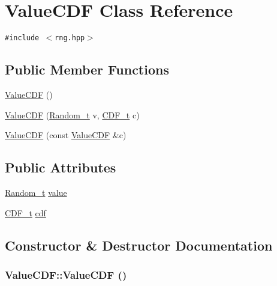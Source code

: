 \hypertarget{classValueCDF}{
\section{ValueCDF Class Reference}
\label{classValueCDF}
}
{\tt \#include $<$rng.hpp$>$}

\subsection*{Public Member Functions}
\begin{CompactItemize}
\item 
\hyperlink{classValueCDF_5fb4ab5f3819cb460bc77e784e8af38b}{ValueCDF} ()
\item 
\hyperlink{classValueCDF_234760674403fcf6b91be1aa5927584c}{ValueCDF} (\hyperlink{rng_8hpp_ad41e7f5d86b1109b6a6a032c86cdd3f}{Random\_\-t} v, \hyperlink{rng_8hpp_68ff29d325e1cb493f27ede4fa99c8e4}{CDF\_\-t} c)
\item 
\hyperlink{classValueCDF_e24002eb4692735666adfa50b1ccabba}{ValueCDF} (const \hyperlink{classValueCDF}{ValueCDF} \&c)
\end{CompactItemize}
\subsection*{Public Attributes}
\begin{CompactItemize}
\item 
\hyperlink{rng_8hpp_ad41e7f5d86b1109b6a6a032c86cdd3f}{Random\_\-t} \hyperlink{classValueCDF_3199cb7b55c7759bc3b4b231ba321e0e}{value}
\item 
\hyperlink{rng_8hpp_68ff29d325e1cb493f27ede4fa99c8e4}{CDF\_\-t} \hyperlink{classValueCDF_111ae2eb1b5618b9cf6c5a59da10fb18}{cdf}
\end{CompactItemize}


\subsection{Constructor \& Destructor Documentation}
\hypertarget{classValueCDF_5fb4ab5f3819cb460bc77e784e8af38b}{
\subsubsection[{ValueCDF}]{\setlength{\rightskip}{0pt plus 5cm}ValueCDF::ValueCDF ()}}
\label{classValueCDF_5fb4ab5f3819cb460bc77e784e8af38b}


